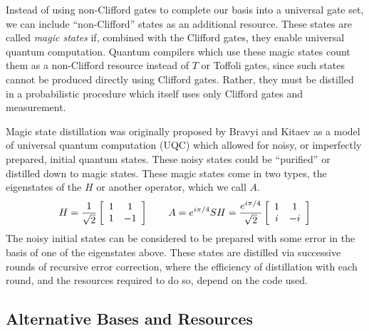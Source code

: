 Instead of using non-Clifford gates to complete our basis into a universal
gate set, we can include ``non-Clifford'' states as an additional resource.
These states are called \emph{magic states} if, combined with the Clifford
gates, they enable universal quantum computation.
Quantum compilers which use these magic states count them as a non-Clifford
resource instead of $T$ or Toffoli gates, since such states cannot
be produced directly using Clifford gates. Rather, they must be
distilled in a probabilistic procedure which itself uses only 
Clifford gates and measurement.

%
%
Magic state distillation was originally proposed by Bravyi and Kitaev
\cite{Bravyi2005} as a model of universal quantum computation (UQC) which
allowed for noisy, or imperfectly prepared, initial quantum states. These
noisy states could be ``purified'' or distilled down to magic states.
These magic states come in two types, the eigenstates
of the $H$ or another operator, which we call $A$.
%
\begin{equation}
H = 
\frac{1}{\sqrt{2}}
\left[ \begin{array}{cc}
1 & 1\\
1 & -1
\end{array} \right]
\qquad
A = e^{i\pi / 4} SH = \frac{e^{i\pi/4}}{\sqrt{2}}
\left[ \begin{array}{cc}
1 & 1\\
i & -i
\end{array} \right]
\label{eqn:T}
\end{equation}
%
The noisy initial states can be considered to be prepared with some
error in the basis of one of the eigenstates above.
These states are distilled via successive rounds of recursive error
correction, where the efficiency of distillation with each round,
and the resources required to do so, depend on the code used.


\subsection{Alternative Bases and Resources}
\label{subsec:qcompile-alternate}

